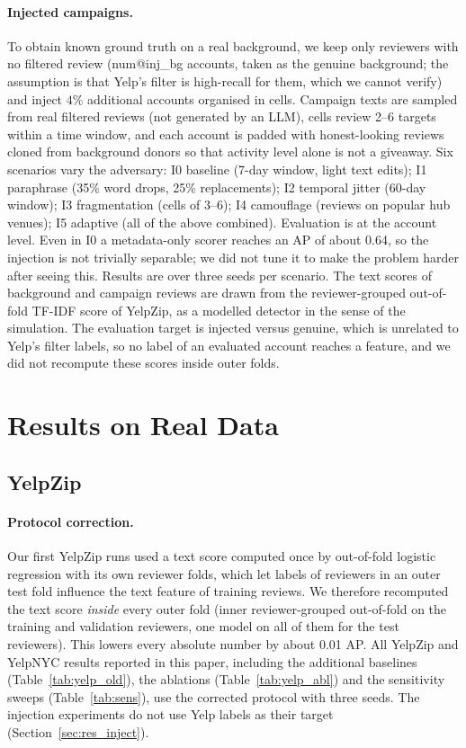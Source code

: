 \documentclass[pdflatex,sn-basic]{sn-jnl}
\makeatletter
\theoremstyle{thmstyleone}
\theoremstyle{thmstylethree}
\newcommand{\num}[1]{\csname num@#1\endcsname}
\makeatother
\begin{document}
\paragraph{Injected campaigns.} To obtain known ground truth on a real background, we keep only reviewers with no filtered review (\num{inj_bg} accounts, taken as the genuine background; the assumption is that Yelp's filter is high-recall for them, which we cannot verify) and inject $4\%$ additional accounts organised in cells. Campaign texts are sampled from real filtered reviews (not generated by an LLM), cells review 2--6 targets within a time window, and each account is padded with honest-looking reviews cloned from background donors so that activity level alone is not a giveaway. Six scenarios vary the adversary: I0 baseline (7-day window, light text edits); I1 paraphrase (35\% word drops, 25\% replacements); I2 temporal jitter (60-day window); I3 fragmentation (cells of 3--6); I4 camouflage (reviews on popular hub venues); I5 adaptive (all of the above combined). Evaluation is at the account level. Even in I0 a metadata-only scorer reaches an AP of about 0.64, so the injection is not trivially separable; we did not tune it to make the problem harder after seeing this. Results are over three seeds per scenario. The text scores of background and campaign reviews are drawn from the reviewer-grouped out-of-fold TF-IDF score of YelpZip, as a modelled detector in the sense of the simulation. The evaluation target is injected versus genuine, which is unrelated to Yelp's filter labels, so no label of an evaluated account reaches a feature, and we did not recompute these scores inside outer folds.

\section{Results on Real Data}\label{sec:real_results}

\subsection{YelpZip}\label{sec:res_yelp}
\paragraph{Protocol correction.} Our first YelpZip runs used a text score computed once by out-of-fold logistic regression with its own reviewer folds, which let labels of reviewers in an outer test fold influence the text feature of training reviews. We therefore recomputed the text score \emph{inside} every outer fold (inner reviewer-grouped out-of-fold on the training and validation reviewers, one model on all of them for the test reviewers). This lowers every absolute number by about 0.01 AP. All YelpZip and YelpNYC results reported in this paper, including the additional baselines (Table~\ref{tab:yelp_old}), the ablations (Table~\ref{tab:yelp_abl}) and the sensitivity sweeps (Table~\ref{tab:sens}), use the corrected protocol with three seeds. The injection experiments do not use Yelp labels as their target (Section~\ref{sec:res_inject}).
\end{document}
